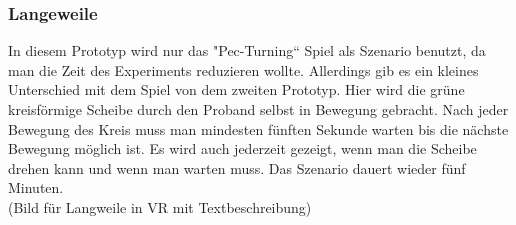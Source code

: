 \subsubsection{Langeweile} \label{langeweile-4}





In diesem Prototyp wird nur das "Pec-Turning“ Spiel als Szenario benutzt, da man die Zeit des Experiments reduzieren wollte. Allerdings gib es ein kleines Unterschied mit dem Spiel von dem zweiten Prototyp. Hier wird die grüne kreisförmige Scheibe durch den Proband selbst in Bewegung gebracht. Nach jeder Bewegung des Kreis muss man mindesten fünften Sekunde warten bis die nächste Bewegung möglich ist. Es wird auch jederzeit gezeigt, wenn man die Scheibe drehen kann und wenn man warten muss. Das Szenario dauert wieder fünf Minuten. \\

(Bild für Langweile in VR mit Textbeschreibung) \\